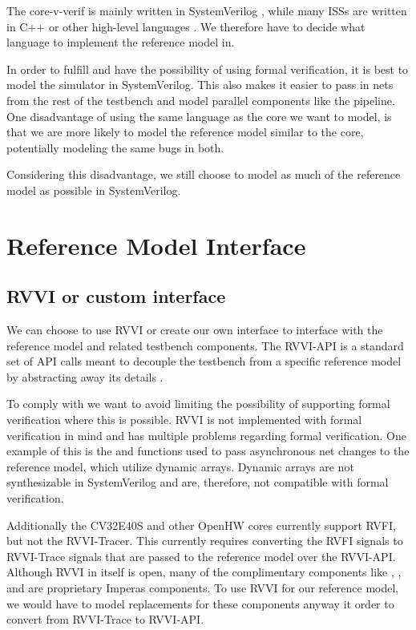 The core-v-verif is mainly written in SystemVerilog \cite{openhwgroupOpenhwgroupCorevverif2023}, while many ISSs are written in C++ or other high-level languages \cite{SpikeRISCVISA2023}.
We therefore have to decide what language to implement the reference model in.

In order to fulfill \textbf{} and have the possibility of using formal verification, it is best to model the simulator in SystemVerilog. This also makes it easier to pass in nets from the rest of the testbench and model parallel components like the pipeline. One disadvantage of using the same language as the core we want to model, is that we are more likely to model the reference model similar to the core, potentially modeling the same bugs in both. 

Considering this disadvantage, we still choose to model as much of the reference model as possible in SystemVerilog. 

\section{Reference Model Interface}
\label{sec:rmInterface}

\subsection{RVVI or custom interface}

We can choose to use RVVI or create our own interface to interface with the reference model and related testbench components. The RVVI-API is a standard set of API calls meant to decouple the testbench from a specific reference model by abstracting away its details \cite{riscv-verificationRISCVVerificationInterface2023}. 

To comply with  we want to avoid limiting the possibility of supporting formal verification where this is possible. RVVI is not implemented with formal verification in mind and has multiple problems regarding formal verification. One example of this is the  and  functions used to pass asynchronous net changes to the reference model, which utilize dynamic arrays. Dynamic arrays are not synthesizable in SystemVerilog \cite{mehtaIntroductionSystemVerilog2021} and are, therefore, not compatible with formal verification. 

Additionally the CV32E40S and other OpenHW cores currently support RVFI, but not the RVVI-Tracer. This currently requires converting the RVFI signals to RVVI-Trace signals that are passed to the reference model over the RVVI-API. 
Although RVVI in itself is open, many of the complimentary components like , , and  are proprietary Imperas components. To use RVVI for our reference model, we would have to model replacements for these components anyway it order to convert from RVVI-Trace to RVVI-API. 

